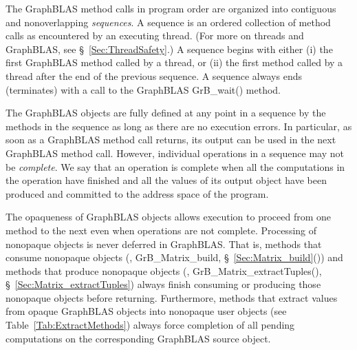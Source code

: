 The GraphBLAS method calls in program order are organized into 
contiguous and nonoverlapping \emph{sequences}.  A sequence is an
ordered collection of method calls as encountered by an executing thread. (For more
on threads and GraphBLAS, see \S~\ref{Sec:ThreadSafety}.)  A sequence
begins with either (i) the first GraphBLAS method called by a thread, or
(ii) the first method called by a thread after the end of the previous
sequence. A sequence always ends (terminates) with a call to the GraphBLAS
{\sf GrB\_wait()} method.

The GraphBLAS objects are fully defined at any point in a sequence by the
methods in the sequence as long as there are no execution errors.
In particular, as soon as a GraphBLAS
method call returns, its output can be used in the next GraphBLAS
method call.  However, individual operations in a sequence may not
be \emph{complete}. We say that an operation is complete when all the
computations in the operation have finished and all the values of its
output object have been produced and committed to the address 
space of the program.

The opaqueness of GraphBLAS objects allows execution to proceed
from one method to the next even when operations are not complete.
Processing of nonopaque objects is never deferred in GraphBLAS. That is,
methods that consume nonopaque objects (\eg, {\sf GrB\_Matrix\_build},
\S~\ref{Sec:Matrix_build}()) and methods that produce nonopaque objects (\eg,
{\sf GrB\_Matrix\_extractTuples()}, \S~\ref{Sec:Matrix_extractTuples})
always finish consuming or producing those nonopaque objects before
returning.   Furthermore, methods that extract values from opaque GraphBLAS objects
into nonopaque user objects (see Table~\ref{Tab:ExtractMethods})
always force completion of all pending computations on the 
corresponding GraphBLAS source object.

